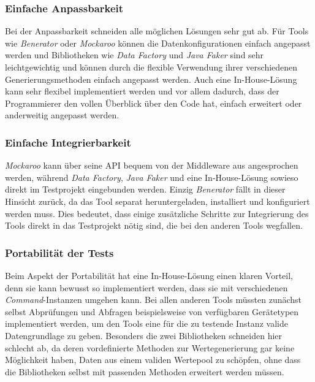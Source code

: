 \newpage
\subsubsection*{Einfache Anpassbarkeit}
Bei der Anpassbarkeit schneiden alle möglichen Lösungen sehr gut ab. Für Tools wie \textit{Benerator} oder \textit{Mockaroo} können die Datenkonfigurationen einfach angepasst werden und Bibliotheken wie \textit{Data Factory} und \textit{Java Faker} sind sehr leichtgewichtig und können durch die flexible Verwendung ihrer verschiedenen Generierungsmethoden einfach angepasst werden. Auch eine In-House-Lösung kann sehr flexibel implementiert werden und vor allem dadurch, dass der Programmierer den vollen Überblick über den Code hat, einfach erweitert oder anderweitig angepasst werden.

\subsubsection*{Einfache Integrierbarkeit}
\textit{Mockaroo} kann über seine \ac{API} bequem von der Middleware aus angesprochen werden, während \textit{Data Factory}, \textit{Java Faker} und eine In-House-Lösung sowieso direkt im Testprojekt eingebunden werden. Einzig \textit{Benerator} fällt in dieser Hinsicht zurück, da das Tool separat heruntergeladen, installiert und konfiguriert werden muss. Dies bedeutet, dass einige zusätzliche Schritte zur Integrierung des Tools direkt in das Testprojekt nötig sind, die bei den anderen Tools wegfallen.

\subsubsection*{Portabilität der Tests}
Beim Aspekt der Portabilität hat eine In-House-Lösung einen klaren Vorteil, denn sie kann bewusst so implementiert werden, dass sie mit verschiedenen \textit{Command}-Instanzen umgehen kann. Bei allen anderen Tools müssten zunächst selbst Abprüfungen und Abfragen beispielsweise von verfügbaren Gerätetypen implementiert werden, um den Tools eine für die zu testende Instanz valide Datengrundlage zu geben. Besonders die zwei Bibliotheken schneiden hier schlecht ab, da deren vordefinierte Methoden zur Wertegenerierung gar keine Möglichkeit haben, Daten aus einem validen Wertepool zu schöpfen, ohne dass die Bibliotheken selbst mit passenden Methoden erweitert werden müssen.

